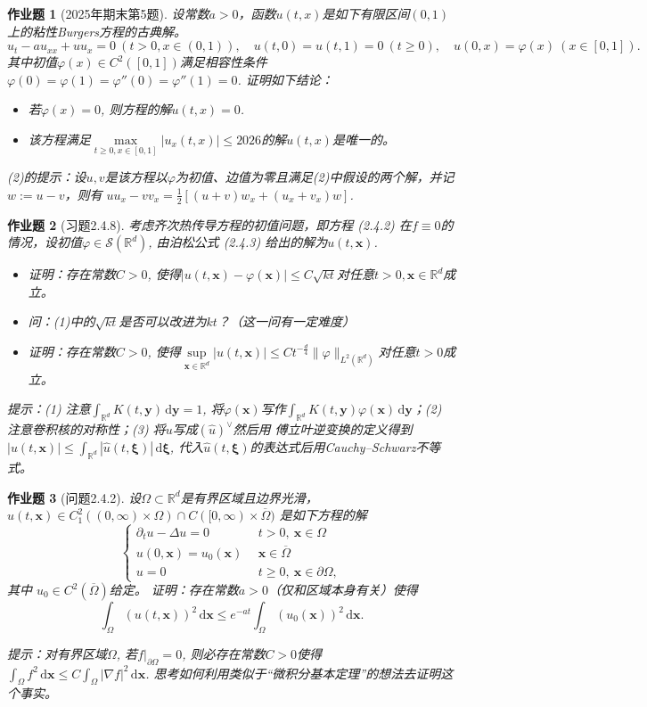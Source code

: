 \documentclass[UTF8,fontset=windows,12pt]{ctexart}
\theoremstyle{kaiti-theorem}
\newtheorem{problem}{作业题}
\numberwithin{equation}{section}
\newcommand{\R}{\mathbb{R}}
\newcommand{\bds}[1]{\boldsymbol{#1}}  %
\newcommand{\sh}{\mathcal{S}}
\newcommand{\Om}{\Omega}
\newcommand{\vp}{\varphi}
\newcommand{\q}{\quad}
\newcommand{\p}{\partial}
\newcommand{\lap}{\Delta}
\newcommand{\nab}{\nabla}
\newcommand{\dxx}{\,\mathrm{d}\bds{x}}
\newcommand{\xxi}{\boldsymbol{\xi}}
\newcommand{\dxxi}{\,\mathrm{d}\boldsymbol{\xi}}
\newcommand{\dyy}{\,\mathrm{d}\bds{y}}
\newcommand{\io}{\int_{\Omega}}
\newcommand{\ird}{\int_{\R^d}}
\newcommand{\xx}{{\bds{x}}}
\newcommand{\yy}{{\bds{y}}}
\begin{document}
\begin{problem}[2025年期末第5题]
设常数$a>0$，函数$u(t,x)$是如下有限区间$(0,1)$上的粘性Burgers方程的古典解。
 $$u_t- a u_{xx} + uu_x =0~(t>0,x\in(0,1)),\q u(t,0)=u(t,1)=0~(t\geqslant 0),\q u(0,x)=\vp(x)~(x\in[0,1]).$$ 其中初值$\vp(x)\in C^2([0,1])$满足相容性条件 $\vp(0)=\vp(1)=\vp''(0)=\vp''(1)=0$. 证明如下结论：
 \begin{itemize}
 	\item [(1)]  若$\vp(x) = 0$, 则方程的解$u(t,x)=0$.
 	\item [(2)]  该方程满足$\max\limits_{t\geqslant 0, x\in[0,1]}|u_x(t,x)|\leqslant 2026$的解$u(t,x)$是唯一的。
 \end{itemize}

(2)的提示：设$u,v$是该方程以$\vp$为初值、边值为零且满足(2)中假设的两个解，并记$w:=u-v$，则有 $uu_x-vv_x=\frac12[(u+v)w_x+(u_x+v_x)w]$.
\end{problem}


\begin{problem}[习题2.4.8] 
考虑齐次热传导方程的初值问题，即方程 (2.4.2) 在$f\equiv0$的情况，设初值$\vp\in\sh(\R^d)$, 由泊松公式 (2.4.3) 给出的解为$u(t,\xx)$. 
\begin{itemize}
\item [(1)] 证明：存在常数$C>0$, 使得$|u(t,\xx)-\vp(\xx)|\leqslant C\sqrt{kt}$对任意$t>0,\xx\in\R^d$成立。
\item [(2)] 问：(1)中的$\sqrt{kt}$是否可以改进为$kt$？（这一问有一定难度）
\item [(3)] 证明：存在常数$C>0$, 使得$\sup\limits_{\xx\in\R^d}|u(t,\xx)|\leqslant Ct^{-\frac{d}{4}}\|\vp\|_{L^2(\R^d)}$对任意$t>0$成立。
\end{itemize}

提示：(1) 注意$\ird K(t,\yy)\dyy=1$, 将$\vp(\xx)$写作$\ird K(t,\yy)\vp(\xx)\dyy$；(2) 注意卷积核的对称性；(3) 将$u$写成$(\hat{u})^\vee$然后用 傅立叶逆变换的定义得到$|u(t,\xx)|\leqslant \ird |\hat{u}(t,\xxi)|\dxxi$, 代入$\hat{u}(t,\xxi)$的表达式后用Cauchy--Schwarz不等式。
\end{problem}


\begin{problem}[问题2.4.2]
设$\Om\subset\R^d$是有界区域且边界光滑，$u(t,\xx)\in C_1^2((0,\infty)\times \Om)\cap C([0,\infty)\times\overline{\Om})$ 是如下方程的解
\begin{equation*}
\begin{cases}
\p_t u-\lap u=0&~~t>0,~\xx\in \Om\\
u(0,\xx)=u_0(\xx)&~~\xx\in\overline{\Om}\\
u=0&~~t\geqslant 0,~\xx\in\p \Om,
\end{cases}
\end{equation*} 其中 $u_0\in C^2(\overline{\Om})$给定。 证明：存在常数$a>0$（仅和区域本身有关）使得
$$\io (u(t,\xx))^2\dxx\leqslant e^{-at}\io (u_0(\xx))^2\dxx.$$

提示：对有界区域$\Om$, 若$f|_{\p\Om}=0$, 则必存在常数$C>0$使得$\io f^2\dxx\leqslant C\io |\nab f|^2\dxx$. 思考如何利用类似于“微积分基本定理”的想法去证明这个事实。
\end{problem}
\end{document}
